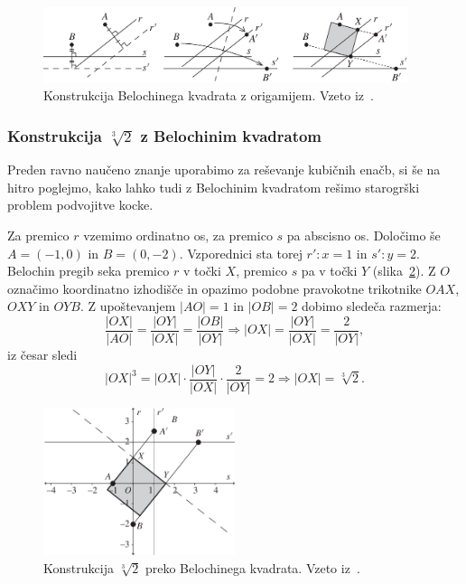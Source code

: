 \begin{figure}[h]
    \centering
    \includegraphics[width=0.95\textwidth]{images/kubična enačba/beloch_kvadrat_konstrukcija.png}
    \caption[Konstrukcija Belochinega kvadrata]{Konstrukcija Belochinega kvadrata z origamijem. Vzeto iz~\cite[str.\ 310]{hull2011}.}
    \label{fig:beloch_kvadrat_konstrukcija}
\end{figure}

\subsubsection*{Konstrukcija $\sqrt[3]{2}$ z Belochinim kvadratom}
\label{podpogl:beloch_kvadrat_koren}

Preden ravno naučeno znanje uporabimo za reševanje kubičnih enačb, si še na hitro poglejmo, kako lahko tudi z Belochinim kvadratom rešimo starogrški problem podvojitve kocke.

Za premico $r$ vzemimo ordinatno os, za premico $s$ pa abscisno os. Določimo še $A = (-1,0)$ in $B = (0, -2)$. Vzporednici sta torej $r': x = 1$ in $s': y = 2$. Belochin pregib seka premico $r$ v točki $X$, premico $s$ pa v točki $Y$ (slika~\ref{fig:beloch_koren}). Z $O$ označimo koordinatno izhodišče in opazimo podobne pravokotne trikotnike $OAX$, $OXY$ in $OYB$. Z upoštevanjem $|AO| = 1 $ in $|OB| = 2$ dobimo sledeča razmerja:
$$ \frac{|OX|}{|AO|} = \frac{|OY|}{|OX|} = \frac{|OB|}{|OY|} \Longrightarrow |OX| = \frac{|OY|}{|OX|} = \frac{2}{|OY|}, $$
iz česar sledi
$$ |OX|^3 = |OX| \cdot \frac{|OY|}{|OX|} \cdot \frac{2}{|OY|} = 2 \Longrightarrow |OX| = \sqrt[3]{2}. $$

\begin{figure}[h]
    \centering
    \includegraphics[width=0.5\textwidth]{images/kubična enačba/beloch_koren.png}
    \caption[Konstrukcija kubičnega korena števila dva]{Konstrukcija $\sqrt[3]{2}$ preko Belochinega kvadrata. Vzeto iz~\cite[str.\ 310]{hull2011}.}
    \label{fig:beloch_koren}
\end{figure}

